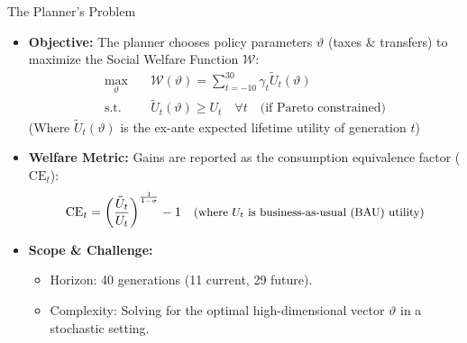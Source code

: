 \documentclass[aspectratio=169,11pt]{beamer}
\begin{document}
\begin{frame}[fragile]{The Planner's Problem}
\small
\begin{itemize}
    \setlength\itemsep{0.8em}
    \item \textbf{Objective:} The planner chooses policy parameters $\vartheta$ (taxes \& transfers) to maximize the Social Welfare Function $\mathcal{W}$:
    \begin{align}
       \max_{\vartheta} \quad & \mathcal{W}(\vartheta) = \sum_{t = -10}^{30} \gamma_t \tilde{U}_t(\vartheta) \\
       \text{s.t.} \quad & \tilde{U}_t(\vartheta) \ge U_t \quad \forall t \quad \text{(if Pareto constrained)} \nonumber
    \end{align}
    \vspace{-0.5em}
    {\footnotesize (Where $\tilde{U}_t(\vartheta)$ is the ex-ante expected lifetime utility of generation $t$)}
    \item \textbf{Welfare Metric:} Gains are reported as the consumption equivalence factor ($\text{CE}_t$):
    \[
       \text{CE}_t = \left(\frac{\tilde{U}_t}{U_t}\right)^{\frac{1}{1-\sigma}}-1 \quad \text{\small{(where $U_t$ is business-as-usual (BAU) utility)}}
    \]
    \item \textbf{Scope \& Challenge:}
    \begin{itemize}
        \item Horizon: 40 generations (11 current, 29 future).
        \item Complexity: Solving for the optimal high-dimensional vector $\vartheta$ in a stochastic setting.
    \end{itemize}
\end{itemize}
\end{frame}
\end{document}
